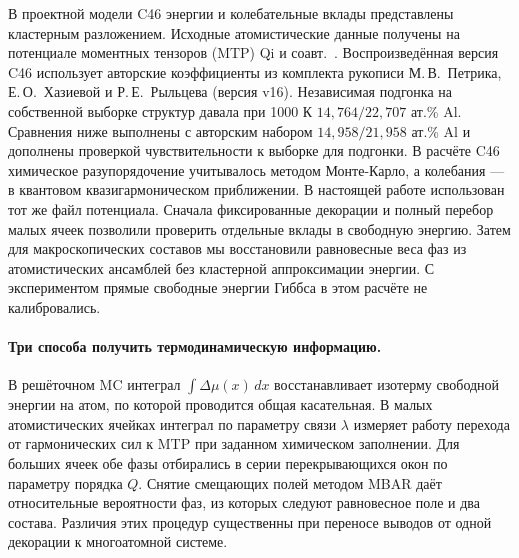 \documentclass[11pt,a4paper]{article}
\begin{document}
В проектной модели C46 энергии и колебательные вклады представлены
кластерным разложением. Исходные атомистические данные получены на
потенциале моментных тензоров (MTP) Qi и соавт.~\cite{qi2023}.
Воспроизведённая версия C46 использует авторские коэффициенты из комплекта
рукописи М.\,В.~Петрика, Е.\,О.~Хазиевой и Р.\,Е.~Рыльцева (версия v16).
Независимая подгонка на собственной выборке структур давала
при 1000 К \(14{,}764/22{,}707\) ат.\% Al. Сравнения ниже выполнены с
авторским набором \(14{,}958/21{,}958\) ат.\% Al и дополнены проверкой
чувствительности к выборке для подгонки.
В расчёте C46 химическое разупорядочение учитывалось методом
Монте-Карло, а колебания — в квантовом квазигармоническом приближении.
В настоящей работе использован тот же файл потенциала. Сначала фиксированные
декорации и полный перебор малых ячеек позволили проверить отдельные
вклады в свободную энергию. Затем для макроскопических составов мы
восстановили равновесные веса фаз из атомистических ансамблей без
кластерной аппроксимации энергии. С экспериментом прямые свободные
энергии Гиббса в этом расчёте не калибровались.

\paragraph{Три способа получить термодинамическую информацию.}
В решёточном MC интеграл \(\int\Delta\mu(x)\,dx\) восстанавливает
изотерму свободной энергии на атом, по которой проводится общая касательная.
В малых атомистических ячейках интеграл по параметру связи \(\lambda\)
измеряет работу перехода от гармонических сил к MTP при заданном
химическом заполнении. Для больших ячеек обе фазы отбирались в серии
перекрывающихся окон по параметру порядка \(Q\). Снятие смещающих полей
методом MBAR даёт относительные вероятности фаз, из которых следуют
равновесное поле и два состава. Различия этих процедур существенны при
переносе выводов от одной декорации к многоатомной системе.
\end{document}
